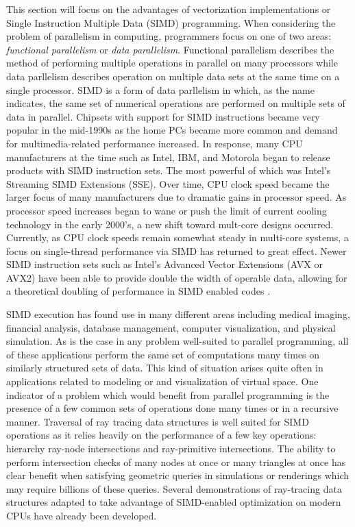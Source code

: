 This section will focus on the advantages of vectorization implementations or
Single Instruction Multiple Data (SIMD) programming. When considering
the problem of parallelism in computing, programmers focus on one of two areas:
\textit{functional parallelism} or \textit{data parallelism}. Functional
parallelism describes the method of performing multiple operations in parallel
on many processors while data parllelism describes operation on multiple
data sets at the same time on a single processor. SIMD is a form of data
parllelism in which, as the name indicates, the same set of numerical operations
are performed on multiple sets of data in parallel. Chipsets with support for
SIMD instructions became very popular in the mid-1990s as the home PCs became
more common and demand for multimedia-related performance increased. In
response, many CPU manufacturers at the time such as Intel, IBM, and Motorola
began to release products with SIMD instruction sets. The most powerful of which
was Intel's Streaming SIMD Extensions (SSE). Over time, CPU clock speed became
the larger focus of many manufacturers due to dramatic gains in processor
speed. As processor speed increases began to wane or push the limit of current
cooling technology in the early 2000's, a new shift toward mult-core designs
occurred. Currently, as CPU clock speeds remain somewhat steady in multi-core
systems, a focus on single-thread performance via SIMD has returned to great
effect. Newer SIMD instruction sets such as Intel's Advanced Vector Extensions
(AVX or AVX2) have been able to provide double the width of operable data,
allowing for a theoretical doubling of performance in SIMD enabled codes
\cite{Hughes_2015}.

SIMD execution has found use in many different areas including medical imaging,
financial analysis, database management, computer visualization, and physical
simulation. As is the case in any problem well-suited to parallel programming,
all of these applications perform the same set of computations many times on
similarly structured sets of data. This kind of situation arises quite often in applications
related to modeling or and visualization of virtual space. One indicator of a
problem which would benefit from parallel programming is the presence of a few
common sets of operations done many times or in a recursive manner. Traversal of
ray tracing data structures is well suited for SIMD operations as it relies
heavily on the performance of a few key operations: hierarchy ray-node
intersections and ray-primitive intersections. The ability to perform intersection
checks of many nodes at once or many triangles at once has clear benefit when
satisfying geometric queries in simulations or renderings which may require
billions of these queries. Several demonstrations of ray-tracing data structures
adapted to take advantage of SIMD-enabled optimization on modern CPUs have
already been developed.

